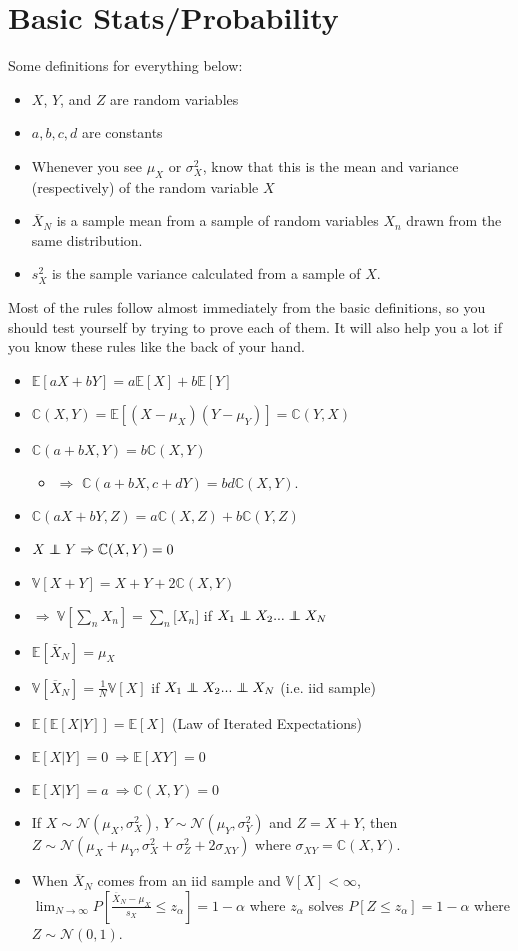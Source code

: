 \documentclass[12pt]{article}
\newcommand\ov{\overline}
\newcommand\BB{\mathbb}
\newcommand\EE{\mathbb{E}}
\newcommand\mc{\mathcal}
\numberwithin{equation}{section}
\numberwithin{figure}{section}
\numberwithin{table}{section}
\newcommand\independent{\protect\mathpalette{\protect\independenT}{\perp}}
\def\independenT#1#2{\mathrel{\rlap{$#1#2$}\mkern2mu{#1#2}}}
\begin{document}
\section*{Basic Stats/Probability}
Some definitions for everything below:
\begin{itemize}
  \item $X$, $Y$, and $Z$ are random variables
  \item $a,b,c,d$ are constants
  \item Whenever you see $\mu_{X}$ or $\sigma^2_{X}$, know that this is the mean and variance (respectively) of the random variable $X$
  \item $\ov{X}_{N}$ is a sample mean from a sample of random variables $X_{n}$ drawn from the same distribution.
  \item $s^2_{X}$ is the sample variance calculated from a sample of $X$.
\end{itemize}
Most of the rules follow almost immediately from the basic definitions, so you should test yourself by trying to prove each of them. It will also help you a lot if you know these rules like the back of your hand.
\begin{itemize}
  \item $\EE[aX + bY] = a\EE[X] + b\EE[Y]$
  \item $\BB{C}(X,Y) = \EE[(X-\mu_{X})(Y-\mu_{Y})] = \BB{C}(Y,X)$
  \item $\BB{C}(a + bX,Y) = b\BB{C}(X,Y)$ 
   \begin{itemize}\item[] $\Rightarrow$ $\BB{C}(a+bX,c+dY) = bd\BB{C}(X,Y)$. \end{itemize}
  \item $\BB{C}(aX + bY,Z) = a\BB{C}(X,Z) + b\BB{C}(Y,Z)$
  \item $X \independent{Y} \Rightarrow \BB{C}(X,Y) = 0$
  \item $\BB{V}[X+Y] = X + Y + 2\BB{C}(X,Y)$
  \item $\Rightarrow\ \BB{V}\left[\sum_{n}X_{n}\right] = \sum_{n}\BB[X_{n}]$ if $X_{1}\independent X_{2}...\independent X_{N}$
  \item $\EE[\ov{X}_{N}] = \mu_{X}$
  \item $\BB{V}[\ov{X}_{N}] = \frac{1}{N}\BB{V}[X]$ if $X_{1}\independent X_{2}...\independent X_{N}$ (i.e. iid sample)
  \item $\EE[\EE[X|Y]] = \EE[X]$ (Law of Iterated Expectations)
  \item $\EE[X|Y]=0\ \Rightarrow \EE[XY] = 0$
  \item $\EE[X|Y] = a\ \Rightarrow \BB{C}(X,Y)=0$
  \item If $X\sim\mc{N}(\mu_{X},\sigma^2_{X})$, $Y\sim\mc{N}(\mu_{Y},\sigma^2_{Y})$ and $Z = X+Y$, then $Z\sim\mc{N}(\mu_{X}+\mu_{Y},\sigma^2_{X}+\sigma^2_{Z}+2\sigma_{XY})$ where $\sigma_{XY}=\BB{C}(X,Y)$.
  \item When $\ov{X}_{N}$ comes from an iid sample and $\BB{V}[X]<\infty$, $\lim_{N\rightarrow\infty}P\left[\frac{\ov{X}_{N}-\mu_{X}}{s_{X}}\leq z_{\alpha}\right] = 1-\alpha$ where $z_{\alpha}$ solves $P[Z\leq z_{\alpha}] = 1-\alpha$ where $Z\sim\mc{N}(0,1)$.
  \end{itemize}
\end{document}
